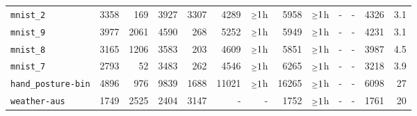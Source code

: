 \begin{tabular}{lrrrrrrrrrrrr}
\texttt{mnist\_2} & 3358 & 169 & 3927 & 3307 & 4289 & $\mathsmaller{\geq}1$h & 5958 & $\mathsmaller{\geq}1$h & - & - & 4326 & 3.1\\
\texttt{mnist\_9} & 3977 & 2061 & 4590 & 268 & 5252 & $\mathsmaller{\geq}1$h & 5949 & $\mathsmaller{\geq}1$h & - & - & 4231 & 3.1\\
\texttt{mnist\_8} & 3165 & 1206 & 3583 & 203 & 4609 & $\mathsmaller{\geq}1$h & 5851 & $\mathsmaller{\geq}1$h & - & - & 3987 & 4.5\\
\texttt{mnist\_7} & 2793 & 52 & 3483 & 262 & 4546 & $\mathsmaller{\geq}1$h & 6265 & $\mathsmaller{\geq}1$h & - & - & 3218 & 3.9\\
\texttt{hand\_posture-bin} & 4896 & 976 & 9839 & 1688 & 11021 & $\mathsmaller{\geq}1$h & 16265 & $\mathsmaller{\geq}1$h & - & - & 6098 & 27\\
\texttt{weather-aus} & 1749 & 2525 & 2404 & 3147 & - & - & 1752 & $\mathsmaller{\geq}1$h & - & - & 1761 & 20\\
\bottomrule
\end{tabular}
